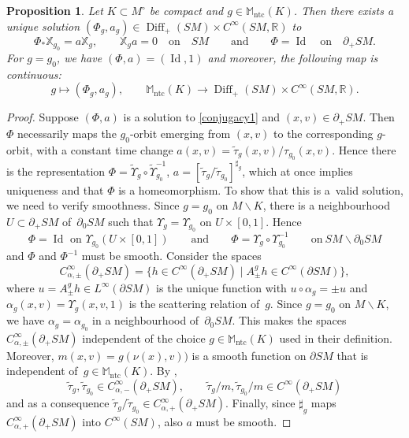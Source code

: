 \documentclass[pdftex]{sigma}
\numberwithin{equation}{section}
\newtheorem{Proposition}[Theorem]{Proposition}
\theoremstyle{definition}
\newcommand{\R}{\mathbb{R}} %
\newcommand{\M}{\mathbb{M}}
\newcommand{\1}{{\bf 1}}
\newcommand{\Id}{\operatorname{Id}}
\newcommand{\ntc}{\mathrm{ntc}}
\DeclareMathOperator{\Diff}{Diff}
\begin{document}
\begin{Proposition}
	Let $K\subset M^\circ$ be compact and $g\in \M_\ntc(K)$. Then there exists a unique solution $(\Phi_g,a_g)\in \Diff_+(SM)\times C^\infty(SM,\R)$ to
	\begin{equation}\label{conjugacy1}
		\Phi_*\mathbb X_{g_0} = a\mathbb X_{g}, \qquad \mathbb X_g a = 0\quad \text{on} \quad SM\qquad \text{and} \qquad \Phi = \Id\quad \text{on}\quad \partial_+SM.
	\end{equation}
	For $g=g_0$, we have $(\Phi,a)=(\Id,1)$ and moreover, the following map is continuous:
	\[g\mapsto (\Phi_g,a_g),\qquad \M_\ntc(K) \rightarrow \Diff_+(SM)\times C^\infty(SM,\R).\]
\end{Proposition}


\begin{proof}
Suppose $(\Phi,a)$ is a solution to \eqref{conjugacy1} and $(x,v)\in \partial_+SM$. Then $\Phi$ necessarily maps the $g_0$-orbit emerging from $(x,v)$
to the corresponding $g$-orbit, with a constant time change $a(x,v)=\tilde \tau_g(x,v)/\tau_{g_0}(x,v)$. Hence there is the representation
$
\Phi= \tilde \Upsilon_g\circ \tilde \Upsilon_{g_0}^{-1}$, $ a= [\tilde \tau_g/\tilde \tau_{g_0}]^{\sharp_{g}}$,
which at once implies uniqueness and that $\Phi$ is a homeomorphism. To show that this is a~valid solution, we need to verify smoothness. Since $g=g_0$ on $M\backslash K$, there is a neighbourhood $U\subset \partial_+SM$ of~$\partial_0SM$ such that $\Upsilon_{g}=\Upsilon_{g_0}$ on $U\times [0,1]$. Hence
\[
	\Phi = \Id \text{ on } \Upsilon_{g_0}(U\times [0,1])\qquad \text{and} \qquad \Phi = \Upsilon_g\circ \Upsilon_{g_0}^{-1}\qquad \text{on}\  SM\backslash \partial_0SM
\]
and $\Phi$ and $\Phi^{-1}$ must be smooth. Consider the spaces
\[
	C_{\alpha,\pm}^\infty(\partial_+SM)=\big\{h\in C^\infty(\partial_+SM)\mid A_{\pm}^g h \in C^\infty(\partial SM)\big\},
\]
where $u=A_{\pm}^g h\in L^\infty(\partial SM)$ is the unique function with $u\circ \alpha_g =\pm u$ and $\alpha_g(x,v)=\Upsilon_{g}(x,v,1)$ is the scattering relation of~$g$. Since $g=g_0$ on $M\backslash K$, we have $\alpha_{g}=\alpha_{g_0}$ in a neighbourhood of~$\partial_0SM$. This makes the spaces $C_{\alpha,\pm}^\infty(\partial_+SM)$ independent of the choice $g\in \M_\ntc(K)$ used in their definition. Moreover, $m(x,v)={g(\nu(x),v))}$ is a smooth function on $\partial SM$ that is independent of~${g\in \M_\ntc(K)}$. By \cite[Section 3.2]{PSU23},
\[
	\tilde \tau_{g}, \tilde\tau_{g_0} \in C^\infty_{\alpha,-}(\partial_+SM),\qquad \tilde \tau_g/m,\tilde \tau_{g_0}/m\in C^\infty(\partial_+SM)
\]
and as a consequence $\tilde \tau_g/\tilde \tau_{g_0} \in C^\infty_{\alpha,+}(\partial_+SM).$
Finally, since $\sharp_g$ maps $C^\infty_{\alpha,+}(\partial_+SM)$ into $C^\infty(SM)$, also $a$ must be smooth.


\end{proof}
\end{document}

